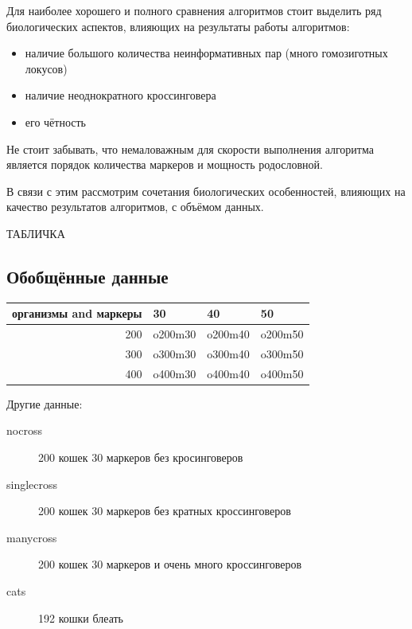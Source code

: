 \documentclass{matmex-diploma-custom}
\begin{document}
Для наиболее хорошего и полного сравнения алгоритмов стоит выделить
ряд биологических аспектов, влияющих на результаты работы алгоритмов:
\begin{itemize}
\item наличие большого количества неинформативных пар (много
  гомозиготных локусов)
\item наличие неоднократного кроссинговера
\item его чётность
\end{itemize}

Не стоит забывать, что немаловажным для скорости выполнения алгоритма
является порядок количества маркеров и мощность родословной.

В связи с этим рассмотрим сочетания биологических особенностей,
влияющих на качество результатов алгоритмов, с объёмом данных.

ТАБЛИЧКА

\subsection{Обобщённые данные}
\begin{tabular}{rlll}
\hline
организмы and маркеры & 30 & 40 & 50 \\
\hline
200 & o200m30 & o200m40 & o200m50 \\
300 & o300m30 & o300m40 & o300m50 \\
400 & o400m30 & o400m40 & o400m50 \\
\hline
\end{tabular}

Другие данные:
\begin{description}
\item[nocross] 200 кошек 30 маркеров без кросинговеров
\item[singlecross] 200 кошек 30 маркеров без кратных кроссинговеров
\item[manycross] 200 кошек 30 маркеров и очень много кроссинговеров
\item[cats] 192 кошки блеать
\end{description}
\end{document}
